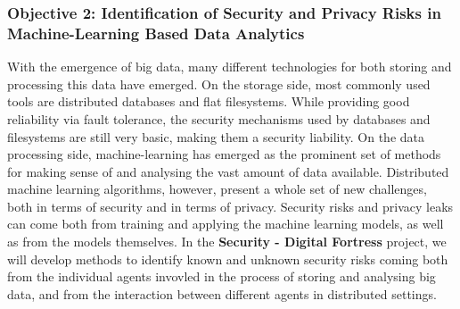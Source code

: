 \documentclass[a4paper,11pt]{article}
\newcommand{\project}[1]{\textbf{#1}\xspace}
\newcommand{\SECURITY}{\project{Security - Digital Fortress}}
\newcommand{\TheProject}{\SECURITY}
\begin{document}


\subsubsection*{Objective 2: Identification of Security and Privacy Risks in Machine-Learning Based Data Analytics}
\vspace{-6pt}

With the emergence of big data, many different technologies for both storing and processing this data have emerged. On the storage side, most commonly used tools are distributed databases and flat filesystems. While providing good reliability via fault tolerance, the security mechanisms used by databases and filesystems are still very basic, making them a security liability. On the data processing side, machine-learning has emerged as the prominent set of methods for making sense of and analysing the vast amount of data available. Distributed machine learning algorithms, however, present a whole set of new challenges, both in terms of security and in terms of privacy. Security risks and privacy leaks can come both from training and applying the machine learning models, as well as from the models themselves. In the \TheProject{} project, we will develop methods to identify known and unknown security risks coming both from the individual agents invovled in the process of storing and analysing big data, and from the interaction between different agents in distributed settings.
\end{document}
